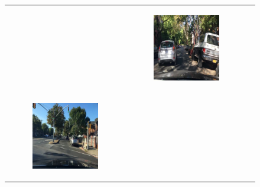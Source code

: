 \begin{figure}
\begin{tabular}{p{\horspace} p{\horspace} p{\horspace}}
\begin{subfigure}[b]{\subfigwidth}
    \end{subfigure} 
    \hfill &
    \begin{subfigure}[b]{\subfigwidth}
        \includegraphics[width=\subfigwidth]{images/gpt4/s3.jpg}
    \end{subfigure} \\
    \begin{subfigure}[b]{\subfigwidth}
        \includegraphics[width=\subfigwidth]{images/gpt4/s4.jpg}

\end{subfigure}
\end{tabular}
\end{figure}
